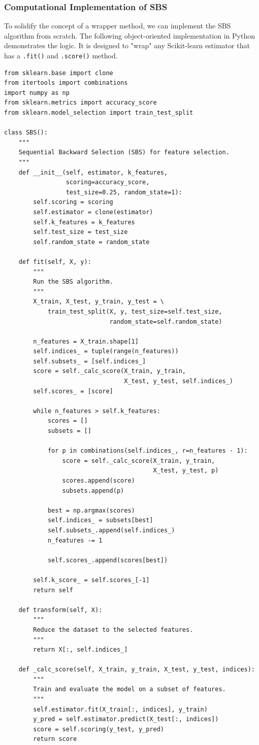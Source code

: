 \subsubsection*{Computational Implementation of SBS}
To solidify the concept of a wrapper method, we can implement the SBS algorithm from scratch. The following object-oriented implementation in Python demonstrates the logic. It is designed to "wrap" any Scikit-learn estimator that has a \texttt{.fit()} and \texttt{.score()} method.

\begin{verbatim}
from sklearn.base import clone
from itertools import combinations
import numpy as np
from sklearn.metrics import accuracy_score
from sklearn.model_selection import train_test_split

class SBS():
    """
    Sequential Backward Selection (SBS) for feature selection.
    """
    def __init__(self, estimator, k_features,
                 scoring=accuracy_score,
                 test_size=0.25, random_state=1):
        self.scoring = scoring
        self.estimator = clone(estimator)
        self.k_features = k_features
        self.test_size = test_size
        self.random_state = random_state

    def fit(self, X, y):
        """
        Run the SBS algorithm.
        """
        X_train, X_test, y_train, y_test = \
            train_test_split(X, y, test_size=self.test_size,
                             random_state=self.random_state)

        n_features = X_train.shape[1]
        self.indices_ = tuple(range(n_features))
        self.subsets_ = [self.indices_]
        score = self._calc_score(X_train, y_train,
                                 X_test, y_test, self.indices_)
        self.scores_ = [score]

        while n_features > self.k_features:
            scores = []
            subsets = []

            for p in combinations(self.indices_, r=n_features - 1):
                score = self._calc_score(X_train, y_train,
                                         X_test, y_test, p)
                scores.append(score)
                subsets.append(p)

            best = np.argmax(scores)
            self.indices_ = subsets[best]
            self.subsets_.append(self.indices_)
            n_features -= 1

            self.scores_.append(scores[best])
        
        self.k_score_ = self.scores_[-1]
        return self

    def transform(self, X):
        """
        Reduce the dataset to the selected features.
        """
        return X[:, self.indices_]

    def _calc_score(self, X_train, y_train, X_test, y_test, indices):
        """
        Train and evaluate the model on a subset of features.
        """
        self.estimator.fit(X_train[:, indices], y_train)
        y_pred = self.estimator.predict(X_test[:, indices])
        score = self.scoring(y_test, y_pred)
        return score
\end{verbatim}


